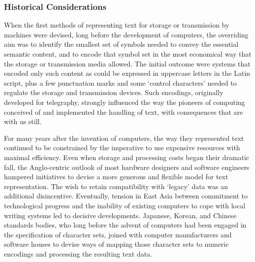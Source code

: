 \subsubsection[{Historical Considerations}]{Historical Considerations}\label{D4-41}\par
When the first methods of representing text for storage or transmission by machines were devised, long before the development of computers, the overriding aim was to identify the smallest set of symbols needed to convey the essential semantic content, and to encode that symbol set in the most economical way that the storage or transmission media allowed. The initial outcome were systems that encoded only such content as could be expressed in uppercase letters in the Latin script, plus a few punctuation marks and some ‘control characters’ needed to regulate the storage and transmission devices. Such encodings, originally developed for telegraphy, strongly influenced the way the pioneers of computing conceived of and implemented the handling of text, with consequences that are with us still.\par
For many years after the invention of computers, the way they represented text continued to be constrained by the imperative to use expensive resources with maximal efficiency. Even when storage and processing costs began their dramatic fall, the Anglo-centric outlook of most hardware designers and software engineers hampered initiatives to devise a more generous and flexible model for text representation. The wish to retain compatibility with ‘legacy’ data was an additional disincentive. Eventually, tension in East Asia between commitment to technological progress and the inability of existing computers to cope with local writing systems led to decisive developments. Japanese, Korean, and Chinese standards bodies, who long before the advent of computers had been engaged in the specification of character sets, joined with computer manufacturers and software houses to devise ways of mapping those character sets to numeric encodings and processing the resulting text data.\par
